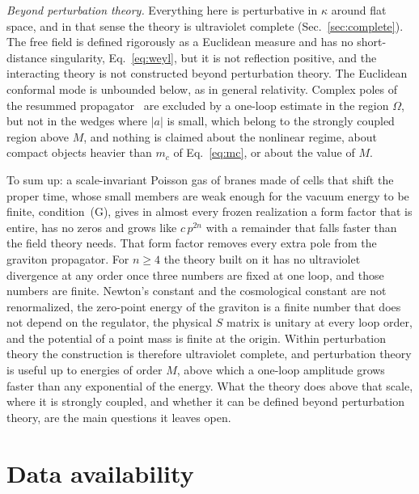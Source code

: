 \documentclass[a4paper,11pt]{article}
\begin{document}
\textit{Beyond perturbation theory.} Everything here is perturbative in $\kappa$ around flat space, and in that sense the theory is ultraviolet complete (Sec.~\ref{sec:complete}). The free field is defined rigorously as a Euclidean measure and has no short-distance singularity, Eq.~\eqref{eq:weyl}, but it is not reflection positive, and the interacting theory is not constructed beyond perturbation theory. The Euclidean conformal mode is unbounded below, as in general relativity. Complex poles of the resummed propagator~\cite{Shapiro2015} are excluded by a one-loop estimate in the region $\Omega$, but not in the wedges where $|a|$ is small, which belong to the strongly coupled region above $M$, and nothing is claimed about the nonlinear regime, about compact objects heavier than $m_c$ of Eq.~\eqref{eq:mc}, or about the value of $M$.

To sum up: a scale-invariant Poisson gas of branes made of cells that shift the proper time, whose small members are weak enough for the vacuum energy to be finite, condition~(G), gives in almost every frozen realization a form factor that is entire, has no zeros and grows like $c\,p^{2n}$ with a remainder that falls faster than the field theory needs. That form factor removes every extra pole from the graviton propagator. For $n\ge4$ the theory built on it has no ultraviolet divergence at any order once three numbers are fixed at one loop, and those numbers are finite. Newton's constant and the cosmological constant are not renormalized, the zero-point energy of the graviton is a finite number that does not depend on the regulator, the physical $S$ matrix is unitary at every loop order, and the potential of a point mass is finite at the origin. Within perturbation theory the construction is therefore ultraviolet complete, and perturbation theory is useful up to energies of order $M$, above which a one-loop amplitude grows faster than any exponential of the energy. What the theory does above that scale, where it is strongly coupled, and whether it can be defined beyond perturbation theory, are the main questions it leaves open.

\section*{Data availability}
\end{document}
